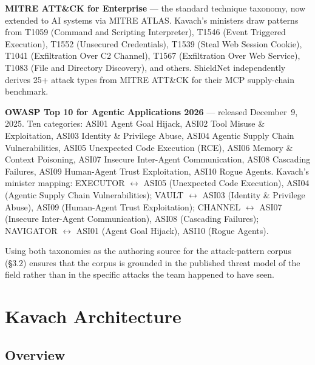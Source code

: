 \documentclass[sigconf,anonymous,review]{acmart}
\begin{document}
\textbf{MITRE ATT\&CK for Enterprise} — the standard technique taxonomy, now
extended to AI systems via MITRE ATLAS. Kavach's ministers draw patterns from
T1059 (Command and Scripting Interpreter), T1546 (Event Triggered Execution),
T1552 (Unsecured Credentials), T1539 (Steal Web Session Cookie), T1041
(Exfiltration Over C2 Channel), T1567 (Exfiltration Over Web Service), T1083
(File and Directory Discovery), and others. ShieldNet \cite{shieldnet2026}
independently derives 25+ attack types from MITRE ATT\&CK for their MCP
supply-chain benchmark.

\textbf{OWASP Top 10 for Agentic Applications 2026} — released December~9, 2025.
Ten categories: ASI01 Agent Goal Hijack, ASI02 Tool Misuse \& Exploitation,
ASI03 Identity \& Privilege Abuse, ASI04 Agentic Supply Chain Vulnerabilities,
ASI05 Unexpected Code Execution (RCE), ASI06 Memory \& Context Poisoning,
ASI07 Insecure Inter-Agent Communication, ASI08 Cascading Failures,
ASI09 Human-Agent Trust Exploitation, ASI10 Rogue Agents. Kavach's minister
mapping:
EXECUTOR $\leftrightarrow$ ASI05 (Unexpected Code Execution), ASI04 (Agentic Supply Chain Vulnerabilities);
VAULT $\leftrightarrow$ ASI03 (Identity \& Privilege Abuse), ASI09 (Human-Agent Trust Exploitation);
CHANNEL $\leftrightarrow$ ASI07 (Insecure Inter-Agent Communication), ASI08 (Cascading Failures);
NAVIGATOR $\leftrightarrow$ ASI01 (Agent Goal Hijack), ASI10 (Rogue Agents).

Using both taxonomies as the authoring source for the attack-pattern corpus (§3.2)
ensures that the corpus is grounded in the published threat model of the field
rather than in the specific attacks the team happened to have seen.


\section{Kavach Architecture}
\label{sec:design}
\label{sec:architecture}

\subsection{Overview}
\end{document}
